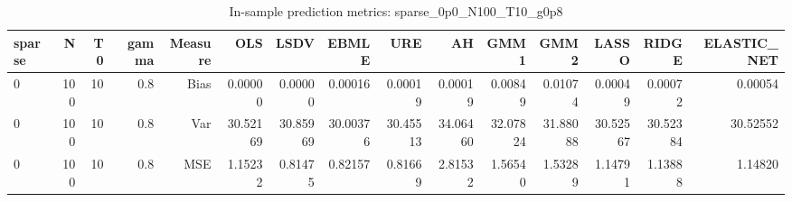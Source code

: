 \begin{table}[!htbp]\centering
\caption{In-sample prediction metrics: sparse_0p0_N100_T10_g0p8}
\label{tab:table2_sparse_0p0_N100_T10_g0p8}
\begin{tabular}{lrrrrrrrrrrrrrr}
\hline
sparse & N & T0 & gamma & Measure & OLS & LSDV & EBMLE & URE & AH & GMM1 & GMM2 & LASSO & RIDGE & ELASTIC_NET \\
\hline
0 & 100 & 10 & 0.8 & Bias & 0.00000 & 0.00000 & 0.00016 & 0.00019 & 0.00019 & 0.00849 & 0.01074 & 0.00049 & 0.00072 & 0.00054 \\
0 & 100 & 10 & 0.8 & Var & 30.52169 & 30.85969 & 30.00376 & 30.45513 & 34.06460 & 32.07824 & 31.88088 & 30.52567 & 30.52384 & 30.52552 \\
0 & 100 & 10 & 0.8 & MSE & 1.15232 & 0.81475 & 0.82157 & 0.81669 & 2.81532 & 1.56540 & 1.53289 & 1.14791 & 1.13888 & 1.14820 \\
\hline
\end{tabular}
\end{table}

